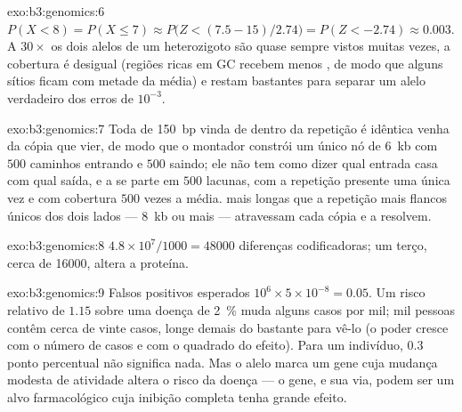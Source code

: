 \begin{solution}{exo:b3:genomics:6}
$P(X < 8) = P(X \le 7) \approx P\bigl(Z < (7.5 - 15)/2.74\bigr) =
P(Z < -2.74) \approx 0.003$. A $30\times$ os dois alelos de um
heterozigoto são quase sempre vistos muitas vezes, a cobertura é
desigual (regiões ricas em GC recebem menos , de modo que
alguns sítios ficam com metade da média) e restam  bastantes
para separar um alelo verdadeiro dos erros de $10^{-3}$.
\end{solution}

\begin{solution}{exo:b3:genomics:7}
Toda  de \qty{150}{bp} vinda de dentro da repetição é idêntica
venha da cópia que vier, de modo que o montador constrói um único nó
de \qty{6}{kb} com $500$ caminhos entrando e $500$ saindo; ele não tem
como dizer qual entrada casa com qual saída, e a  se parte em
$500$ lacunas, com a repetição presente uma única vez e com cobertura
$500$ vezes a média.  mais longas que a repetição mais flancos
únicos dos dois lados --- \qty{8}{kb} ou mais --- atravessam cada cópia
e a resolvem.
\end{solution}

\begin{solution}{exo:b3:genomics:8}
$4.8\times 10^{7}/1000 = \num{48000}$ diferenças codificadoras; um
terço, cerca de \num{16000}, altera a proteína.
\end{solution}

\begin{solution}{exo:b3:genomics:9}
Falsos positivos esperados $10^{6}\times 5\times 10^{-8} = 0.05$. Um
risco relativo de $1.15$ sobre uma doença de \qty{2}{\%} muda alguns
casos por mil; mil pessoas contêm cerca de vinte casos, longe demais
do bastante para vê-lo (o poder cresce com o número de casos e com o
quadrado do efeito). Para um indivíduo, $0.3$ ponto percentual não
significa nada. Mas o alelo marca um gene cuja mudança modesta de
atividade altera o risco da doença --- o gene, e sua via, podem ser um
alvo farmacológico cuja inibição completa tenha grande efeito.
\end{solution}

